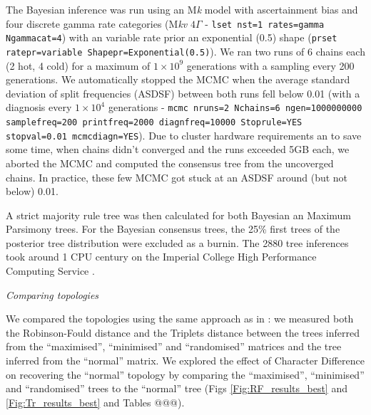 \documentclass[12pt,letterpaper]{article}
\renewcommand{\subsection}[1]{%
\bigskip
\begin{center}
\begin{large}
\normalfont\itshape #1
\end{large}
\end{center}}
\begin{document}
The Bayesian inference was run using an M\textit{k} model with ascertainment bias and four discrete gamma rate categories (M\textit{kv} $4\Gamma$ - \texttt{lset nst=1 rates=gamma Ngammacat=4}) with an variable rate prior an exponential (0.5) shape (\texttt{prset ratepr=variable Shapepr=Exponential(0.5)}).
We ran two runs of 6 chains each (2 hot, 4 cold) for a maximum of $1\times10^9$ generations with a sampling every 200 generations.
We automatically stopped the MCMC when the average standard deviation of split frequencies (ASDSF) between both runs fell below 0.01 (with a diagnosis every $1\times10^4$ generations - \texttt{mcmc nruns=2 Nchains=6 ngen=1000000000 samplefreq=200 printfreq=2000 diagnfreq=10000 Stoprule=YES stopval=0.01 mcmcdiagn=YES}).
Due to cluster hardware requirements an to save some time, when chains didn't converged and the runs exceeded 5GB each, we aborted the MCMC and computed the consensus tree from the uncoverged chains.
In practice, these few MCMC got stuck at an ASDSF around (but not below) 0.01.

A strict majority rule tree was then calculated for both Bayesian an Maximum Parsimony trees.
For the Bayesian consensus trees, the 25\% first trees of the posterior tree distribution were excluded as a burnin.
The 2880 tree inferences took around 1 CPU century on the Imperial College High Performance Computing Service \citep[2-3GHz clock rate;][]{HPC}.

\subsection{Comparing topologies}
We compared the topologies using the same approach as in \cite{Guillerme2016146}: we measured both the Robinson-Fould distance \citep{RF1981} and the Triplets distance \citep{dobson1975triplets} between the trees inferred from the ``maximised'', ``minimised'' and ``randomised'' matrices and the tree inferred from the ``normal'' matrix.
We explored the effect of Character Difference on recovering the ``normal'' topology by comparing the ``maximised'', ``minimised'' and ``randomised'' trees to the ``normal'' tree (Figs \ref{Fig:RF_results_best} and \ref{Fig:Tr_results_best} and Tables @@@).
\end{document}
